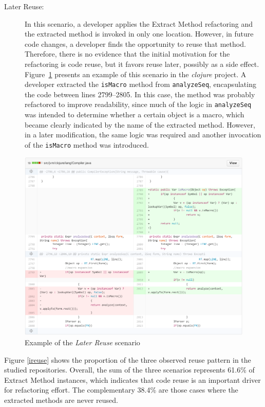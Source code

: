 \begin{description}
\item[Later Reuse:] In this scenario, a developer applies the Extract Method refactoring and the extracted method is invoked in only one location. However, in future code changes, a developer finds the opportunity to reuse that method. Therefore, there is no evidence that the initial motivation for the refactoring is code reuse, but it favors reuse later, possibly as a side effect.
Figure~\ref{iexpost} presents an example of this scenario in the \textit{clojure} project. A developer extracted the \texttt{isMacro} method from \texttt{analyzeSeq}, encapsulating the code between lines 2799--2805. In this case, the method was probably refactored to improve readability, since much of the logic in \texttt{analyzeSeq} was intended to determine whether a certain object is a macro, which became clearly indicated by the name of the extracted method. However, in a later modification, the same logic was required and another invocation of the \texttt{isMacro} method was introduced.
\end{description}

\begin{figure}[htbp]\centering
\includegraphics[width=1\textwidth]{img/ch5/post.pdf}
\caption{Example of the \textit{Later Reuse} scenario}
\label{iexpost}
\end{figure}



Figure \ref{ireuse} shows the proportion of the three observed reuse pattern in the studied repositories. Overall, the sum of the three scenarios represents 61.6\% of Extract Method instances, which indicates that code reuse is an important driver for refactoring effort. The complementary 38.4\% are those cases where the extracted methods are never reused.

